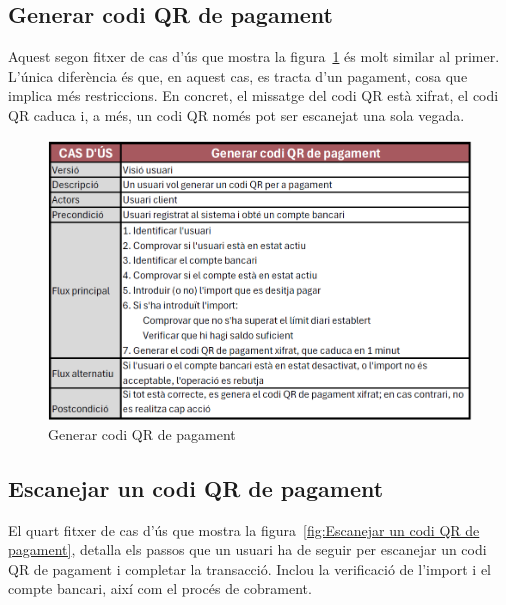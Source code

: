 \documentclass[a4paper,12pt,twoside]{ThesisStyle}
\begin{document}
\clearpage
\subsection{Generar codi QR de pagament}
\label{subsec:Generar codi QR de pagament}

Aquest segon fitxer de cas d'ús que mostra la figura~\ref{fig:Generar codi QR de pagament} és molt similar al primer. L'única diferència és que, en aquest cas, es tracta d'un pagament, cosa que implica més restriccions. En concret, el missatge del codi QR està xifrat, el codi QR caduca i, a més, un codi QR només pot ser escanejat una sola vegada.



\begin{figure}[h]
    \centering
    \includegraphics[width=1\textwidth]{imatges/f2.png}
    \caption{Generar codi QR de pagament}
    \label{fig:Generar codi QR de pagament}
\end{figure}

\clearpage


\subsection{Escanejar un codi QR de pagament}
\label{subsec:Escanejar un codi QR de pagament}

El quart fitxer de cas d'ús que mostra la figura~\ref{fig:Escanejar un codi QR de pagament}, detalla els passos que un usuari ha de seguir per escanejar un codi QR de pagament i completar la transacció. Inclou la verificació de l'import i el compte bancari, així com el procés de cobrament.
\end{document}
